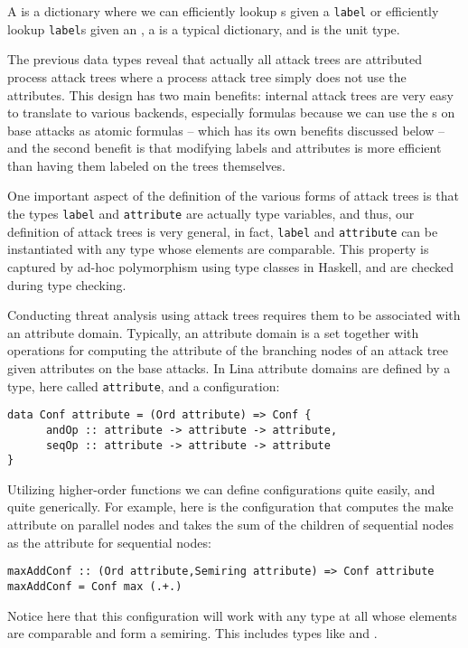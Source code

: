 \noindent
A  is a dictionary where we can efficiently lookup
s given a \verb!label! or efficiently lookup \verb!label!s given an
, a  is a typical dictionary, and \mh{()} is the unit
type.

The previous data types reveal that actually all attack trees are
attributed process attack trees where a process attack tree simply
does not use the attributes.  This design has two main benefits:
internal attack trees are very easy to translate to various backends,
especially formulas because we can use the s on base attacks as
atomic formulas -- which has its own benefits discussed below -- and the
second benefit is that modifying labels and attributes is more
efficient than having them labeled on the trees themselves.

One important aspect of the definition of the various forms of attack
trees is that the types \verb!label! and \verb!attribute! are actually
type variables, and thus, our definition of attack trees is very
general, in fact, \verb!label! and \verb!attribute! can be
instantiated with any type whose elements are comparable.  This
property is captured by ad-hoc polymorphism using type classes in
Haskell, and are checked during type checking.

Conducting threat analysis using attack trees requires them to be
associated with an attribute domain.  Typically, an attribute domain
is a set together with operations for computing the attribute of the
branching nodes of an attack tree given attributes on the base
attacks.  In Lina attribute domains are defined by a type, here called
\verb!attribute!, and a configuration:
\begin{center}
  \begin{verbatim}
data Conf attribute = (Ord attribute) => Conf {
      andOp :: attribute -> attribute -> attribute,
      seqOp :: attribute -> attribute -> attribute
}
\end{verbatim}
\end{center}
Utilizing higher-order functions we can define configurations quite
easily, and quite generically.  For example, here is the configuration
that computes the make attribute on parallel nodes and takes the sum
of the children of sequential nodes as the attribute for sequential
nodes:
\begin{center}
  \begin{verbatim}
maxAddConf :: (Ord attribute,Semiring attribute) => Conf attribute
maxAddConf = Conf max (.+.)
\end{verbatim}
\end{center}
Notice here that this configuration will work with any type at all
whose elements are comparable and form a semiring.  This includes
types like  and .

